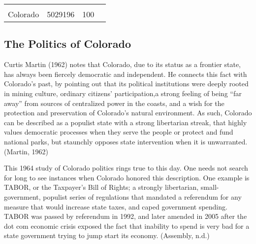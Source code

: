 \documentclass[12pt,twoside]{reedthesis}
\begin{document}
\begin{longtable}[]{@{}lccl@{}}
\begin{minipage}[t]{0.34\columnwidth}
  \strut
  \end{minipage}\tabularnewline
  \begin{minipage}[t]{0.13\columnwidth}\raggedright\strut
  Colorado\strut
  \end{minipage} & \begin{minipage}[t]{0.21\columnwidth}\centering\strut
  5029196\strut
  \end{minipage} & \begin{minipage}[t]{0.20\columnwidth}\centering\strut
  100\strut
  \end{minipage} & \begin{minipage}[t]{0.34\columnwidth}\raggedright\strut
  \strut
  \end{minipage}\tabularnewline
  \bottomrule
  \end{longtable}
  
  \clearpage
  
  \subsection{The Politics of Colorado}\label{the-politics-of-colorado}
  
  Curtis Martin (1962) notes that Colorado, due to its status as a
  frontier state, has always been fiercely democratic and independent. He
  connects this fact with Colorado's past, by pointing out that its
  political institutions were deeply rooted in mining culture, ordinary
  citizens' participation,a strong feeling of being ``far away'' from
  sources of centralized power in the coasts, and a wish for the
  protection and preservation of Colorado's natural environment. As such,
  Colorado can be described as a populist state with a strong libertarian
  streak, that highly values democratic processes when they serve the
  people or protect and fund national parks, but staunchly opposes state
  intervention when it is unwarranted. (Martin, 1962)
  
  This 1964 study of Colorado politics rings true to this day. One needs
  not search for long to see instances when Colorado honored this
  description. One example is TABOR, or the Taxpayer's Bill of Rights; a
  strongly libertarian, small-government, populist series of regulations
  that mandated a referendum for any measure that would increase state
  taxes, and caped government spending. TABOR was passed by referendum in
  1992, and later amended in 2005 after the dot com economic crisis
  exposed the fact that inability to spend is very bad for a state
  government trying to jump start its economy. (Assembly, n.d.)
  
\end{document}
